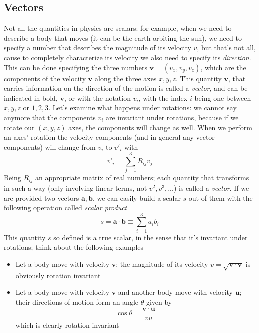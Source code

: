 \subsection{Vectors}
Not all the quantities in physics are scalars: for example, when we need to describe a body that moves (it can be the earth orbiting the sun), we need to specify a number that describes the magnitude of its velocity $v$, but that's not all, cause to completely characterize its velocity we also need to specify its \textit{direction}. This can be done specifying the three numbers $\mathbf{v}=(v_x,v_y,v_z)$, which are the components of the velocity $\mathbf{v}$ along the three axes $x,y,z$. This quantity $\mathbf{v}$, that carries information on the direction of the motion is called a \textit{vector}, and can be indicated in bold, $\mathbf{v}$, or with the notation $v_i$, with the index $i$ being one between $x,y,z$ or $1,2,3$. Let's examine what happens under rotations: we cannot say anymore that the components $v_i$ are invariant under rotations, because if we rotate our $(x,y,z)$ axes, the components will change as well. When we perform an axes' rotation the velocity components (and in general any vector 
components) will change from $v_i$ to $v'_i$ with
\begin{equation}
v'_i=\sum_{j=1}^3R_{ij}v_j
\end{equation}
Being $R_{ij}$ an appropriate matrix of real numbers; each quantity that transforms in such a way (only involving linear terms, not $v^2,v^3,...$) is called a \textit{vector}. If we are provided two vectors $\mathbf{a},\mathbf{b}$, we can easily build a scalar $s$ out of them with the following operation called \textit{scalar product}
\begin{equation}
\label{scalarprod}
s=\mathbf{a}\cdot\mathbf{b}\equiv \sum_{i=1}^3a_ib_i
\end{equation}
This quantity $s$ so defined is a true scalar, in the sense that it's invariant under rotations; think about the following examples
\begin{itemize}
\item Let a body move with velocity $\mathbf{v}$; the magnitude of its velocity $v=\sqrt{\mathbf{v}\cdot{\mathbf{v}}}$ is obviously rotation invariant
\item Let a body move with velocity $\mathbf{v}$ and another body move with velocity $\mathbf{u}$; their directions of motion form an angle $\theta$ given by
\begin{equation}
\cos{\theta}=\frac{\mathbf{v}\cdot\mathbf{u}}{vu}
\end{equation}
which is clearly rotation invariant
\end{itemize}
